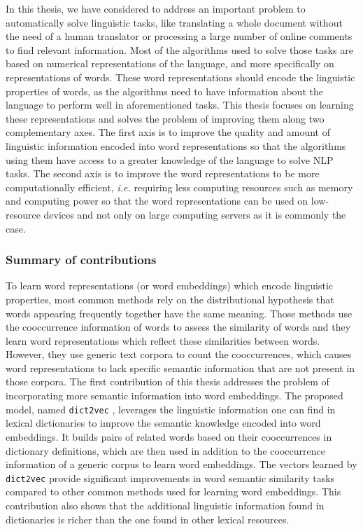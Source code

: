 \fancyhead[LE]{\textbf{\thepage}}
\fancyhead[RO]{\textbf{\thepage}}

In this thesis, we have considered to address an important problem to
automatically solve linguistic tasks, like translating a whole document without
the need of a human translator or processing a large number of online comments
to find relevant information. Most of the algorithms used to solve those tasks
are based on numerical representations of the language, and more specifically on
representations of words. These word representations should encode the
linguistic properties of words, as the algorithms need to have information about
the language to perform well in aforementioned tasks. This thesis focuses on
learning these representations and solves the problem of improving them along
two complementary axes. The first axis is to improve the quality and amount of
linguistic information encoded into word representations so that the algorithms
using them have access to a greater knowledge of the language to solve NLP
tasks. The second axis is to improve the word representations to be more
computationally efficient, \textit{i.e.} requiring less computing resources such
as memory and computing power so that the word representations can be used on
low-resource devices and not only on large computing servers as it is commonly
the case.

\subsubsection{Summary of contributions}
  To learn word representations (or word embeddings) which encode linguistic
  properties, most common methods rely on the distributional hypothesis that
  words appearing frequently together have the same meaning. Those methods use
  the cooccurrence information of words to assess the similarity of words and
  they learn word representations which reflect these similarities between
  words. However, they use generic text corpora to count the cooccurrences,
  which causes word representations to lack specific semantic information that
  are not present in those corpora. The first contribution of this thesis
  addresses the problem of incorporating more semantic information into word
  embeddings. The proposed model, named \texttt{dict2vec}
  \citep{tissier2017dict2vec}, leverages the linguistic information one can find
  in lexical dictionaries to improve the semantic knowledge encoded into word
  embeddings. It builds pairs of related words based on their cooccurrences in
  dictionary definitions, which are then used in addition to the cooccurrence
  information of a generic corpus to learn word embeddings. The vectors learned
  by \texttt{dict2vec} provide significant improvements in word semantic
  similarity tasks compared to other common methods used for learning word
  embeddings. This contribution also shows that the additional linguistic
  information found in dictionaries is richer than the one found in other
  lexical resources.\medskip


